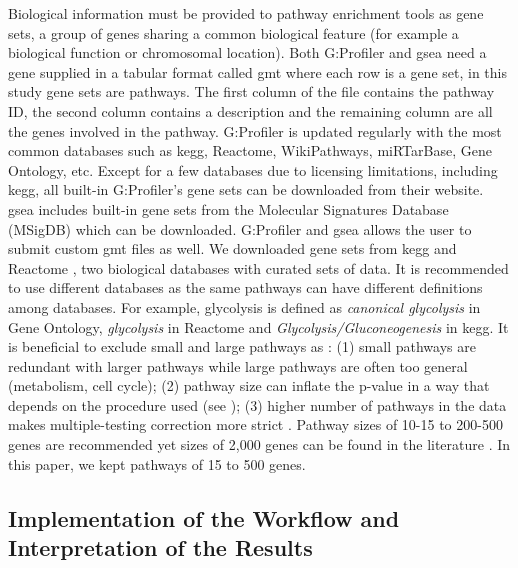 Biological information must be provided to pathway enrichment tools as gene sets, a group of genes sharing a common biological feature (for example a biological function or chromosomal location).
Both G:Profiler and \acrshort{gsea} need a gene supplied in a tabular format called \acrfull{gmt} where each row is a gene set, in this study gene sets are pathways.
The first column of the file contains the pathway ID, the second column contains a description and the remaining column are all the genes involved in the pathway.
G:Profiler is updated regularly with the most common databases such as \acrshort{kegg}, Reactome, WikiPathways, miRTarBase, Gene Ontology, etc.
Except for a few databases due to licensing limitations, including \acrshort{kegg}, all built-in G:Profiler's gene sets can be downloaded from their website.
\acrshort{gsea} includes built-in gene sets from the Molecular Signatures Database (MSigDB) which can be downloaded.
G:Profiler and \acrshort{gsea} allows the user to submit custom \acrshort{gmt} files as well.
We downloaded gene sets from \acrshort{kegg} \cite*{Kanehisa2019} and Reactome \cite*{Gillespie2022}, two biological databases with curated sets of data.
It is recommended to use different databases as the same pathways can have different definitions among databases.
For example, glycolysis is defined as \textit{canonical glycolysis} in Gene Ontology, \textit{glycolysis} in Reactome and \textit{Glycolysis/Gluconeogenesis} in \acrshort{kegg}.
It is beneficial to exclude small and large pathways as : (1) small pathways are redundant with larger pathways while large pathways are often too general (metabolism, cell cycle); (2) pathway size can inflate the p-value in a way that depends on the procedure used (see \cite{maleki_measuring_2019,karp_pathway_2021,damian_statistical_2004,Reimand2019}); (3) higher number of pathways in the data makes multiple-testing correction more strict \cite*{Reimand2019}.
Pathway sizes of 10-15 to 200-500 genes are recommended yet sizes of 2,000 genes can be found in the literature \cite*{Reimand2019}.
In this paper, we kept pathways of 15 to 500 genes.

\subsection{Implementation of the Workflow and Interpretation of the Results}

